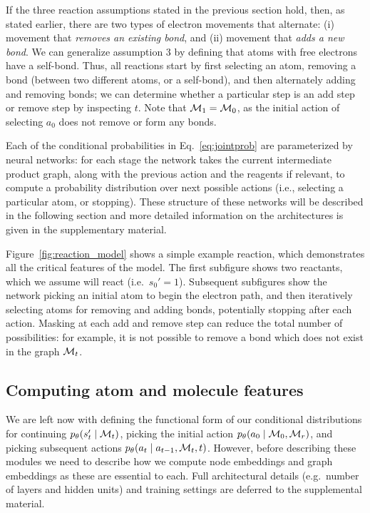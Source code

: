 If the three reaction assumptions stated in the previous section hold, then, as stated earlier, there are two types of electron movements that alternate: 
(i) movement that \emph{removes an existing bond}, and 
(ii) movement that \emph{adds a new bond}. 
We can generalize assumption 3 by defining that atoms with free electrons have a self-bond. 
Thus, all reactions start by first selecting an atom, removing a bond (between two different atoms, or a self-bond), and then alternately adding and removing bonds;
we can determine whether a particular step is an add step or remove step by inspecting $t$.
Note that ${\mathcal{M}}_1 = {\mathcal{M}}_0$, as the initial action of selecting $a_0$ does not remove or form any bonds.

Each of the conditional probabilities in Eq.~\eqref{eq:jointprob} are parameterized by neural networks:
for each stage the network takes the current intermediate product graph, 
along with the previous action and the reagents if relevant, 
to compute a probability distribution over next possible actions (i.e., selecting a particular atom, or stopping).
These structure of these networks will be described in the following section and more detailed information on the architectures is given in the supplementary material.

Figure~\ref{fig:reaction_model} shows a simple example reaction, which demonstrates all the critical features of the model.
The first subfigure shows two reactants, which we assume will react (i.e.\ $s_0' = 1$).
Subsequent subfigures show the network picking an initial atom to begin the electron path,
and then iteratively selecting atoms for removing and adding bonds, potentially stopping after each action.
Masking at each add and remove step can reduce the total number of possibilities: 
for example, it is not possible to remove a bond which does not exist in the graph ${\mathcal{M}}_t$.

\subsection{Computing atom and molecule features}


We are left now with defining the functional form of our conditional distributions for continuing $p_\theta(s'_t \mid {\mathcal{M}}_t)$, picking the initial action $p_\theta(a_0 \mid {\mathcal{M}}_0, {\mathcal{M}}_r)$, and picking subsequent actions $p_\theta(a_t \mid a_{t-1}, {\mathcal{M}}_t, t)$.
However, before describing these modules we need to describe how we compute node embeddings and graph embeddings as these  are  essential to each.
Full architectural details (e.g.\ number of layers and hidden units) 
and training settings are deferred to the supplemental material.

